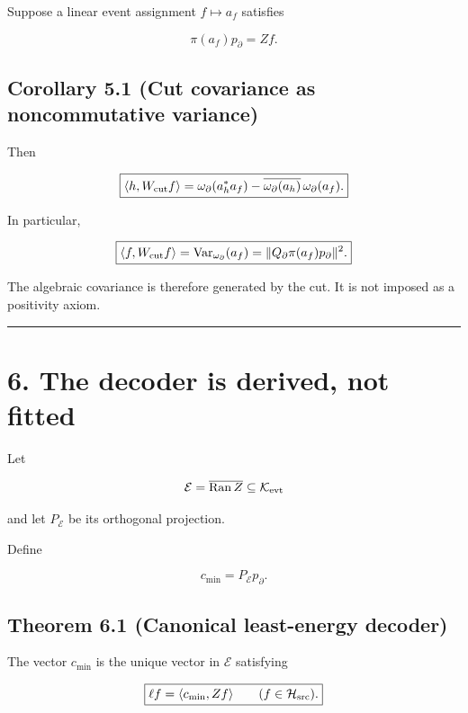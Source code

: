 Suppose a linear event assignment \(f\mapsto a_f\) satisfies

\[
\pi(a_f)p_\partial=Zf.
\]

\hypertarget{corollary-5.1-cut-covariance-as-noncommutative-variance}{%
\subsection{Corollary 5.1 (Cut covariance as noncommutative variance)}\label{corollary-5.1-cut-covariance-as-noncommutative-variance}}

Then

\[
\boxed{
\langle h,W_{\rm cut}f\rangle
=
\omega_\partial(a_h^*a_f)
-
\overline{\omega_\partial(a_h)}\,
\omega_\partial(a_f).
}
\]

In particular,

\[
\boxed{
\langle f,W_{\rm cut}f\rangle
=\operatorname{Var}_{\omega_\partial}(a_f)
=\|Q_\partial\pi(a_f)p_\partial\|^2.
}
\]

The algebraic covariance is therefore generated by the cut. It is not imposed
as a positivity axiom.

\begin{center}\rule{0.5\linewidth}{0.5pt}\end{center}

\hypertarget{the-decoder-is-derived-not-fitted}{%
\section{6. The decoder is derived, not fitted}\label{the-decoder-is-derived-not-fitted}}

Let

\[
\mathcal E
=\overline{\operatorname{Ran}Z}
\subseteq\mathcal K_{\rm evt}
\]

and let \(P_{\mathcal E}\) be its orthogonal projection.

Define

\[
\boxed{
c_{\min}=P_{\mathcal E}p_\partial.
}
\]

\hypertarget{theorem-6.1-canonical-least-energy-decoder}{%
\subsection{Theorem 6.1 (Canonical least-energy decoder)}\label{theorem-6.1-canonical-least-energy-decoder}}

The vector \(c_{\min}\) is the unique vector in \(\mathcal E\) satisfying

\[
\boxed{
\ell f
=\langle c_{\min},Zf\rangle
\qquad(f\in\mathcal H_{\rm src}).
}
\]

